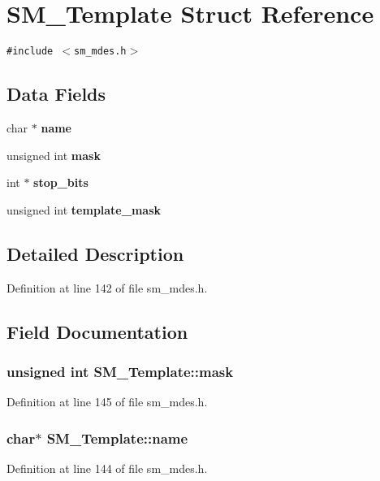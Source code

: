\section{SM\_\-Template Struct Reference}
\label{structSM__Template}
{\tt \#include $<$sm\_\-mdes.h$>$}

\subsection*{Data Fields}
\begin{CompactItemize}
\item 
char $\ast$ \bf{name}
\item 
unsigned int \bf{mask}
\item 
int $\ast$ \bf{stop\_\-bits}
\item 
unsigned int \bf{template\_\-mask}
\end{CompactItemize}


\subsection{Detailed Description}




Definition at line 142 of file sm\_\-mdes.h.

\subsection{Field Documentation}
\subsubsection{\setlength{\rightskip}{0pt plus 5cm}unsigned int \bf{SM\_\-Template::mask}}\label{structSM__Template_6eb2e46e68aa3d2627ae1c5ec0063ed2}




Definition at line 145 of file sm\_\-mdes.h.
\subsubsection{\setlength{\rightskip}{0pt plus 5cm}char$\ast$ \bf{SM\_\-Template::name}}\label{structSM__Template_64067d5876255279931b70090a9af1c3}




Definition at line 144 of file sm\_\-mdes.h.

